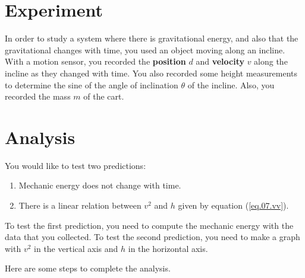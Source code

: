 \section{Experiment}
In order to study a system where there is gravitational energy, and also that the gravitational changes with time, you used an object moving along an incline. With a motion sensor, you recorded the \textbf{position} $d$ and \textbf{velocity} $v$ along the incline as they changed with time. You also recorded some height measurements to determine the sine of the angle of inclination $\theta$ of the incline. Also, you recorded the mass $m$ of the cart.
\section{Analysis}
You would like to test two predictions:
\begin{enumerate}
    \item Mechanic energy does not change with time.
    \item There is a linear relation between $v^{2}$ and $h$ given by equation (\ref{eq.07.vv}).
\end{enumerate}
To test the first prediction, you need to compute the mechanic energy with the data that you collected. To test the second prediction, you need to make a graph with $v^{2}$ in the vertical axis and $h$ in the horizontal axis.

Here are some steps to complete the analysis.

